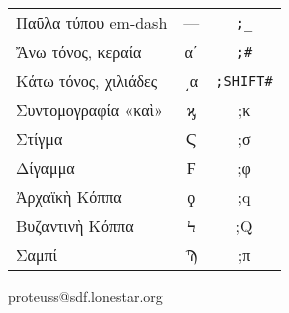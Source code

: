 \documentclass[12pt,a4paper]{article}
\begin{document}
\begin{center}
{\begin{tabularx}{12cm}{lcC}
      Παῦλα τύπου em-dash            &  —   &  \texttt{;{\_}} \\
      Ἄνω τόνος, κεραία              &  αʹ  &  \texttt{;\#}      \\
      Κάτω τόνος, χιλιάδες           & ͵α   &  \texttt{;{\small SHIFT}\#}    \\
      Συντομογραφία «καὶ»            &  ϗ   &  ;κ      \\
      Στίγμα                         &  Ϛ   &  ;σ      \\
      Δίγαμμα                        &  Ϝ   &  ;φ       \\
      Ἀρχαϊκὴ Κόππα                  &  ϙ   &  ;q      \\
      Βυζαντινὴ Κόππα                &  Ϟ   &  ;Q       \\
      Σαμπί                          &  Ϡ   &  ;π      \\\bottomrule
\end{tabularx}
}
\end{center}  
\tiny{proteuss@sdf.lonestar.org}
\end{document}
